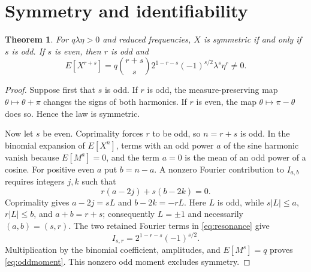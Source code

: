 \documentclass[11pt]{amsart}
\numberwithin{equation}{section}\setcounter{tocdepth}{3}\setcounter{secnumdepth}{3}
\newtheorem{theorem}{Theorem}[section]\newtheorem{proposition}[theorem]{Proposition}
\begin{document}
\section{Symmetry and identifiability}\label{sec:symmetry}
\begin{theorem}\label{thm:symmetry}
For $q\lambda\eta>0$ and reduced frequencies, $X$ is symmetric if and only if $s$ is odd.
If $s$ is even, then $r$ is odd and
\begin{equation}E[X^{r+s}]=q\binom{r+s}{s}2^{1-r-s}(-1)^{s/2}\lambda^s\eta^r\ne0.\label{eq:oddmoment}\end{equation}
\end{theorem}
\begin{proof}
Suppose first that $s$ is odd.  If $r$ is odd, the measure-preserving map
$\theta\mapsto\theta+\pi$ changes the signs of both harmonics.  If $r$ is even, the
map $\theta\mapsto\pi-\theta$ does so.  Hence the law is symmetric.

Now let $s$ be even.  Coprimality forces $r$ to be odd, so $n=r+s$ is odd.  In the
binomial expansion of $E[X^n]$, terms with an odd power $a$ of the sine harmonic vanish
because $E[M^a]=0$, and the term $a=0$ is the mean of an odd power of a cosine.  For
positive even $a$ put $b=n-a$.  A nonzero Fourier contribution to $I_{a,b}$ requires
integers $j,k$ such that
\begin{equation}
 r(a-2j)+s(b-2k)=0.
 \label{eq:symmetry_resonance_equation}
\end{equation}
Coprimality gives $a-2j=sL$ and $b-2k=-rL$.  Here $L$ is odd, while
$s|L|\le a$, $r|L|\le b$, and $a+b=r+s$; consequently $L=\pm1$ and necessarily
$(a,b)=(s,r)$.  The two retained Fourier terms in \eqref{eq:resonance} give
\begin{equation}
 I_{s,r}=2^{1-r-s}(-1)^{s/2}.
 \label{eq:unique_odd_resonance}
\end{equation}
Multiplication by the binomial coefficient, amplitudes, and $E[M^s]=q$ proves
\eqref{eq:oddmoment}.  This nonzero odd moment excludes symmetry.
\end{proof}
\end{document}
